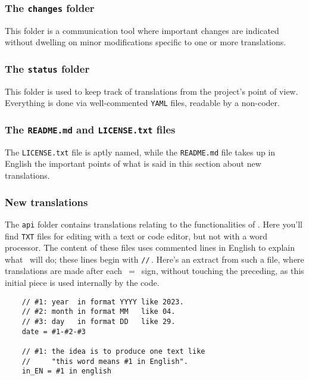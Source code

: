 \subsubsection{The \texttt{changes} folder}

This folder is a communication tool where important changes are indicated without dwelling on minor modifications specific to one or more translations.


\subsubsection{The \texttt{status} folder}

This folder is used to keep track of translations from the project's point of view. Everything is done via well-commented \verb#YAML# files, readable by a non-coder.


\subsubsection{The \texttt{README.md} and \texttt{LICENSE.txt} files}

The \texttt{LICENSE.txt} file is aptly named, while the \texttt{README.md} file takes up in English the important points of what is said in this section about new translations.


\subsubsection{New translations}
\label{tutodoc-contrib-translate}

\begin{tdocimp}
    The \verb#api# folder contains translations relating to the functionalities of \thisproj.
    Here you'll find \verb#TXT# files for editing with a text or code editor, but not with a word processor.
    The content of these files uses commented lines in English to explain what \thisproj\ will do; these lines begin with \verb#//#\,. Here's an extract from such a file, where translations are made after each \,$=$\ sign, without touching the preceding, as this initial piece is used internally by the \thisproj code.

    \tdocsep
    \vspace{-10pt}
    \begin{verbatim}
    // #1: year  in format YYYY like 2023.
    // #2: month in format MM   like 04.
    // #3: day   in format DD   like 29.
    date = #1-#2-#3

    // #1: the idea is to produce one text like
    //     "this word means #1 in English".
    in_EN = #1 in english\end{verbatim}
\end{tdocimp}


